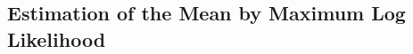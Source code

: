 \documentclass{sig-alternate}
\begin{document}

\subsection{Estimation of the Mean by Maximum Log Likelihood}
\end{document}
